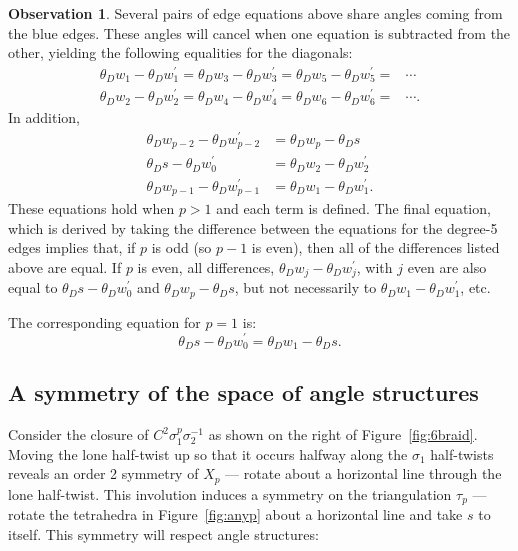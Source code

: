\documentclass[reqno]{amsart}
\theoremstyle{plain}
\theoremstyle{definition}
\newtheorem{observation}{Observation}
\begin{document}
\begin{observation}\label{obs:diagonaleqs}
Several pairs of  edge equations above share angles coming from the blue edges.  These angles will cancel when one equation is subtracted from the other, yielding the following equalities for the diagonals:
\begin{align*}
    \theta_D w_1-\theta_D w_1^\prime
    =\theta_D w_3-\theta_D w_3^\prime
    =\theta_D w_5-\theta_D w_5^\prime
    =&\cdots
    \\
\theta_D w_2-\theta_D w_2^\prime
    =\theta_D w_4-\theta_D w_4^\prime
    =\theta_D w_6-\theta_D w_6^\prime
    =&\cdots.
\end{align*}
In addition,
\begin{align*}
      \theta_D w_{p-2}-\theta_D w_{p-2}^\prime
    &=\theta_D w_p-\theta_D s
      \\
       \theta_D s-\theta_D w_0^\prime
    &=\theta_D w_2-\theta_D w_2^\prime
    \\
 \theta_D w_{p-1}-\theta_D w_{p-1}^\prime
    &=\theta_D w_1-\theta_D w_1^\prime.
\end{align*}
These equations hold when $p>1$ and each term is defined.
The final equation, which is derived by taking the difference between the equations for the degree-5 edges implies that, if $p$ is odd (so $p-1$
 is even), then all of the differences listed above are equal.  If $p$ is even, all differences, $\theta_D w_j-\theta_D w_j^\prime$, with $j$ even are also equal to $\theta_D s-\theta_D w_0^\prime$ and $\theta_D w_p-\theta_D s$, but not necessarily to $\theta_D w_1-\theta_D w_1^\prime$, etc. 
 
 
\end{observation}
The corresponding equation for $p=1$ is:
$$
      \theta_D s-\theta_D w_0^\prime
    =\theta_D w_1-\theta_D s.
$$

\subsection{A symmetry of the space of angle structures}\label{sec:symmetry}

Consider the closure of $C^2\sigma_1^p\sigma_2^{-1}$ as shown on the right of Figure~\ref{fig:6braid}.  Moving the lone half-twist up so that it occurs halfway along the $\sigma_1$ half-twists reveals an order 2 symmetry of $X_p$ --- rotate about a horizontal line through the lone half-twist.  This involution induces a symmetry on the triangulation $\tau_p$ --- rotate the tetrahedra in Figure~\ref{fig:anyp} about a horizontal line and take $s$ to itself.  This symmetry will respect  angle structures:
\end{document}
